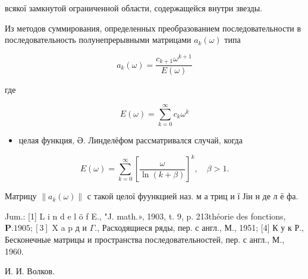 \documentclass[10pt]{article}
\begin{document}
всякої замкнутой ограниченной области, содержащейся внутри звезды.



Из методов суммирования, определенных преобразованием последовательности в последовательность полунепрерывными матрицами $a_{k}(\omega)$ типа



\[

a_{k}(\omega)=\frac{c_{k+1} \omega^{k+1}}{E(\omega)}

\]



где



\[

E(\omega)=\sum_{k=0}^{\infty} c_{k} \omega^{k}

\]



\begin{itemize}

  \item целая функция, Ә. Линделёфом рассматривался случай, когда

\end{itemize}



\[

E(\omega)=\sum_{k=0}^{\infty}\left[\frac{\omega}{\ln (k+\beta)}\right]^{k}, \quad \beta>1 .

\]



Матрицу $\left\|a_{k}(\omega)\right\|$ с такой целої фуункцией наз. м а триц и ї Јін н де л ё фа.



Jum.: [1] L i n d e l ö f E., "J. math.», 1903, t. 9, p. 213théorie des fonctions, $\mathbf{P} .1905 ;[3]$ X a p д и $\Gamma$., Расходящиеся ряды, пер. с англ., М., 1951; [4] К у к Р., Бесконечные матрицы и пространства последовательностей, пер. с англ., М., 1960.



И. И. Волков.
\end{document}
